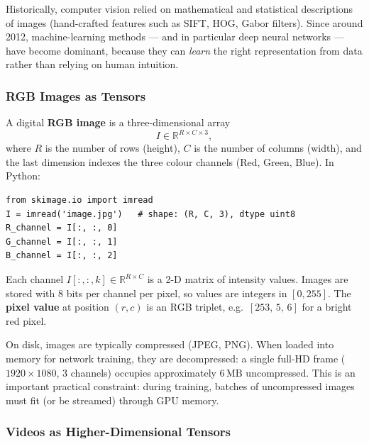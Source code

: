 \documentclass[11pt,a4paper]{article}
\begin{document}
\begin{insightbox}
Historically, computer vision relied on mathematical and statistical descriptions of images (hand-crafted
features such as SIFT, HOG, Gabor filters).  Since around 2012, machine-learning methods — and in particular
deep neural networks — have become dominant, because they can \emph{learn} the right representation from data
rather than relying on human intuition.
\end{insightbox}

\subsubsection{RGB Images as Tensors}

A digital \textbf{RGB image} is a three-dimensional array
\[
  I \in \mathbb{R}^{R \times C \times 3},
\]
where $R$ is the number of rows (height), $C$ is the number of columns (width), and the last
dimension indexes the three colour channels (Red, Green, Blue).  In Python:

\begin{lstlisting}
from skimage.io import imread
I = imread('image.jpg')   # shape: (R, C, 3), dtype uint8
R_channel = I[:, :, 0]
G_channel = I[:, :, 1]
B_channel = I[:, :, 2]
\end{lstlisting}

Each channel $I[:,:,k] \in \mathbb{R}^{R \times C}$ is a 2-D matrix of intensity values.
Images are stored with 8 bits per channel per pixel, so values are integers in $[0, 255]$.
The \textbf{pixel value} at position $(r, c)$ is an RGB triplet, e.g.\ $[253,\,5,\,6]$ for a
bright red pixel.

\begin{notebox}
On disk, images are typically compressed (JPEG, PNG).  When loaded into memory for network
training, they are decompressed: a single full-HD frame ($1920 \times 1080$, 3 channels) occupies
approximately $6\,\mathrm{MB}$ uncompressed.  This is an important practical constraint: during
training, batches of uncompressed images must fit (or be streamed) through GPU memory.
\end{notebox}

\subsubsection{Videos as Higher-Dimensional Tensors}
\end{document}
